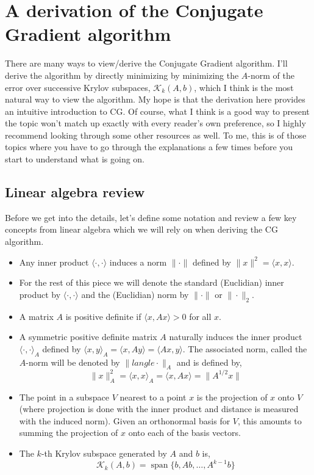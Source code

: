 \hypertarget{a-derivation-of-the-conjugate-gradient-algorithm}{%
\section{A derivation of the Conjugate Gradient
algorithm}\label{a-derivation-of-the-conjugate-gradient-algorithm}}

There are many ways to view/derive the Conjugate Gradient algorithm.
I'll derive the algorithm by directly minimizing by minimizing the
\(A\)-norm of the error over successive Krylov subspaces,
\(\mathcal{K}_k(A,b)\), which I think is the most natural way to view
the algorithm. My hope is that the derivation here provides an intuitive
introduction to CG. Of course, what I think is a good way to present the
topic won't match up exactly with every reader's own preference, so I
highly recommend looking through some other resources as well. To me,
this is of those topics where you have to go through the explanations a
few times before you start to understand what is going on.

\hypertarget{linear-algebra-review}{%
\subsection{Linear algebra review}\label{linear-algebra-review}}

Before we get into the details, let's define some notation and review a
few key concepts from linear algebra which we will rely on when deriving
the CG algorithm.

\begin{itemize}
\tightlist
\item
  Any inner product \(\langle \cdot,\cdot \rangle\) induces a norm
  \(\|\cdot\|\) defined by \(\|x\|^2 = \langle x,x\rangle\).
\item
  For the rest of this piece we will denote the standard (Euclidian)
  inner product by \(\langle \cdot,\cdot\rangle\) and the (Euclidian)
  norm by \(\|\cdot\|\) or \(\|\cdot\|_2\).
\item
  A matrix \(A\) is positive definite if \(\langle x, Ax\rangle > 0\)
  for all \(x\).
\item
  A symmetric positive definite matrix \(A\) naturally induces the inner
  product \(\langle \cdot,\cdot \rangle_A\) defined by
  \(\langle x,y\rangle_A = \langle x,Ay\rangle = \langle Ax,y \rangle\).
  The associated norm, called the \(A\)-norm will be denoted by
  \(\|langle \cdot \|_A\) and is defined by, \[
  \|x\|_A^2 = \langle x,x \rangle_A = \langle x,Ax \rangle = \| A^{1/2}x \|
  \]
\item
  The point in a subspace \(V\) nearest to a point \(x\) is the
  projection of \(x\) onto \(V\) (where projection is done with the
  inner product and distance is measured with the induced norm). Given
  an orthonormal basis for \(V\), this amounts to summing the projection
  of \(x\) onto each of the basis vectors.
\item
  The \(k\)-th Krylov subspace generated by \(A\) and \(b\) is, \[
  \mathcal{K}_k(A,b) = \operatorname{span}\{b,Ab,\ldots,A^{k-1}b\}
  \]
\end{itemize}

